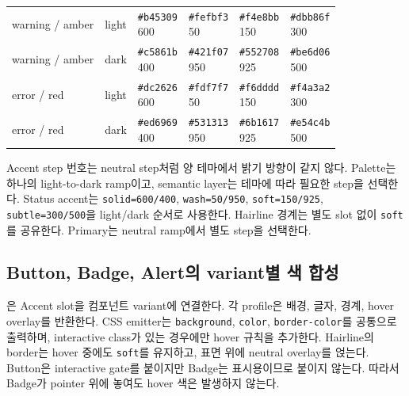 \documentclass[11pt,titlepage]{article}
\begin{document}
\begin{table}[htbp]
\begin{tabularx}{\textwidth}{@{}l l *{4}{>{\centering\arraybackslash}X}@{}}
warning / amber & light & \shortstack{\texttt{\#b45309}\\600} & \shortstack{\texttt{\#fefbf3}\\50} & \shortstack{\texttt{\#f4e8bb}\\150} & \shortstack{\texttt{\#dbb86f}\\300} \\
warning / amber & dark & \shortstack{\texttt{\#c5861b}\\400} & \shortstack{\texttt{\#421f07}\\950} & \shortstack{\texttt{\#552708}\\925} & \shortstack{\texttt{\#be6d06}\\500} \\
error / red & light & \shortstack{\texttt{\#dc2626}\\600} & \shortstack{\texttt{\#fdf7f7}\\50} & \shortstack{\texttt{\#f6dddd}\\150} & \shortstack{\texttt{\#f4a3a2}\\300} \\
error / red & dark & \shortstack{\texttt{\#ed6969}\\400} & \shortstack{\texttt{\#531313}\\950} & \shortstack{\texttt{\#6b1617}\\925} & \shortstack{\texttt{\#e54c4b}\\500} \\
\bottomrule
\end{tabularx}
\end{table}

Accent step 번호는 neutral step처럼 양 테마에서 밝기 방향이 같지 않다. Palette는 하나의 light-to-dark ramp이고, semantic layer는 테마에 따라 필요한 step을 선택한다. Status accent는 \texttt{solid=600/400}, \texttt{wash=50/950}, \texttt{soft=150/925}, \texttt{subtle=300/500}을 light/dark 순서로 사용한다. Hairline 경계는 별도 slot 없이 \texttt{soft}를 공유한다. Primary는 neutral ramp에서 별도 step을 선택한다.

\subsection{Button, Badge, Alert의 variant별 색 합성}

은 Accent slot을 컴포넌트 variant에 연결한다. 각 profile은 배경, 글자, 경계, hover overlay를 반환한다. CSS emitter는 \texttt{background}, \texttt{color}, \texttt{border-color}를 공통으로 출력하며, interactive class가 있는 경우에만 hover 규칙을 추가한다. Hairline의 border는 hover 중에도 \texttt{soft}를 유지하고, 표면 위에 neutral overlay를 얹는다. Button은 interactive gate를 붙이지만 Badge는 표시용이므로 붙이지 않는다. 따라서 Badge가 pointer 위에 놓여도 hover 색은 발생하지 않는다.
\end{document}
